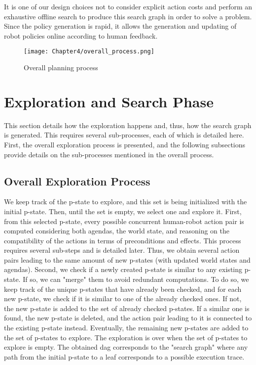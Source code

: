 It is one of our design choices not to consider explicit action costs and perform an exhaustive offline search to produce this search graph in order to solve a problem. Since the policy generation is rapid, it allows the generation and updating of robot policies online according to human feedback. 


\begin{figure}
    \texttt{[image: Chapter4/overall\_process.png]}
    \caption{Overall planning process}
    \label{fig:overall_process}
\end{figure}

\section{Exploration and Search Phase}

This section details how the exploration happens and, thus, how the search graph is generated. This requires several sub-processes, each of which is detailed here. First, the overall exploration process is presented, and the following subsections provide details on the sub-processes mentioned in the overall process.

    \subsection{Overall Exploration Process}

We keep track of the p-state to explore, and this set is being initialized with the initial p-state. Then, until the set is empty, we select one and explore it.
First, from this selected p-state, every possible concurrent human-robot action pair is computed considering both agendas, the world state, and reasoning on the compatibility of the actions in terms of preconditions and effects. This process requires several sub-steps and is detailed later. Thus, we obtain several action pairs leading to the same amount of new p-states (with updated world states and agendas).
Second, we check if a newly created p-state is similar to any existing p-state. If so, we can "merge" them to avoid redundant computations. To do so, we keep track of the unique p-states that have already been checked, and for each new p-state, we check if it is similar to one of the already checked ones. 
If not, the new p-state is added to the set of already checked p-states. 
If a similar one is found, the new p-state is deleted, and the action pair leading to it is connected to the existing p-state instead.
Eventually, the remaining new p-states are added to the set of p-states to explore. 
The exploration is over when the set of p-states to explore is empty. The obtained \acrshort{dag} corresponds to the "search graph" where any path from the initial p-state to a leaf corresponds to a possible execution trace.

